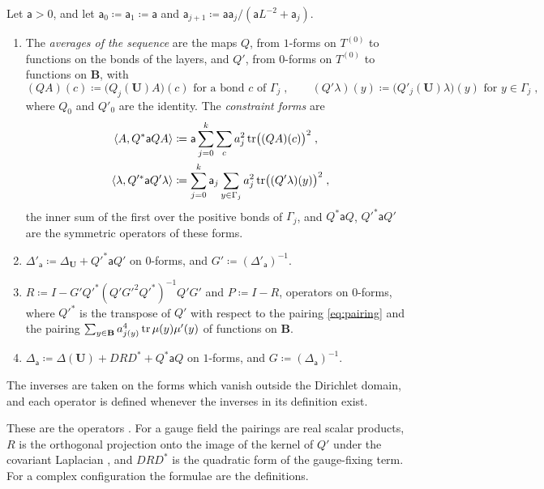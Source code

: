 \documentclass[11pt]{preprint}
\numberwithin{equation}{section}
\begin{document}
\begin{definition}\label{def:operators}
Let $\mathsf a > 0$, and let $\mathsf a_0 \coloneqq \mathsf a_1 \coloneqq \mathsf a$ and $\mathsf a_{j+1} \coloneqq \mathsf a\mathsf a_j/(\mathsf aL^{-2} + \mathsf a_j)$.
\begin{enumerate}[label=(\roman*)]
\item The \emph{averages of the sequence} are the maps $Q$, from $1$-forms on $T^{(0)}$ to functions on the bonds of the layers, and $Q'$, from $0$-forms on $T^{(0)}$ to functions on $\mathbf B$, with
\[
    (QA)(c) \coloneqq \bigl(Q_j(\mathbf U)A\bigr)(c) \text{ for a bond } c \text{ of } \Gamma_j\;,
    \qquad
    (Q'\lambda)(y) \coloneqq \bigl(Q'_j(\mathbf U)\lambda\bigr)(y) \text{ for } y \in \Gamma_j\;,
\]
where $Q_0$ and $Q'_0$ are the identity. The \emph{constraint forms} are
\begin{equation}\label{eq:constraint-forms}
\begin{aligned}
    \langle A, Q^*\mathsf aQA\rangle &\coloneqq \mathsf a\sum_{j=0}^{k}\sum_{c}a_j^2\operatorname{tr}\bigl((QA)(c)\bigr)^2\;,\\
    \langle\lambda, Q'^*\mathsf aQ'\lambda\rangle &\coloneqq \sum_{j=0}^{k}\mathsf a_j\sum_{y \in \Gamma_j}a_j^2\operatorname{tr}\bigl((Q'\lambda)(y)\bigr)^2\;,
\end{aligned}
\end{equation}
the inner sum of the first over the positive bonds of $\Gamma_j$, and $Q^*\mathsf aQ$, $Q'^*\mathsf aQ'$ are the symmetric operators of these forms.
\item $\Delta'_{\mathsf a} \coloneqq \Delta_{\mathbf U} + Q'^*\mathsf aQ'$ on $0$-forms, and $G' \coloneqq (\Delta'_{\mathsf a})^{-1}$.
\item $R \coloneqq I - G'Q'^*(Q'G'^2Q'^*)^{-1}Q'G'$ and $P \coloneqq I - R$, operators on $0$-forms, where $Q'^*$ is the transpose of $Q'$ with respect to the pairing \eqref{eq:pairing} and the pairing $\sum_{y \in \mathbf B}a_{j(y)}^4\operatorname{tr}\mu(y)\mu'(y)$ of functions on $\mathbf B$.
\item $\Delta_{\mathsf a} \coloneqq \Delta(\mathbf U) + DRD^* + Q^*\mathsf aQ$ on $1$-forms, and $G \coloneqq (\Delta_{\mathsf a})^{-1}$.
\end{enumerate}
The inverses are taken on the forms which vanish outside the Dirichlet domain, and each operator is defined whenever the inverses in its definition exist.
\end{definition}

These are the operators \cite[(3.16), (3.18)--(3.27), pp.~393--395]{BalabanPBG}. For a gauge field the pairings are real scalar products, $R$ is the orthogonal projection onto the image of the kernel of $Q'$ under the covariant Laplacian \cite[(3.21), (3.25)]{BalabanPBG}, and $DRD^*$ is the quadratic form of the gauge-fixing term. For a complex configuration the formulae are the definitions.
\end{document}
